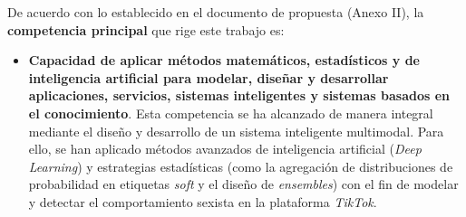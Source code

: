 De acuerdo con lo establecido en el documento de propuesta (Anexo II), la \textbf{competencia principal} que rige este trabajo es: 
\begin{itemize}
    \item \textbf{Capacidad de aplicar métodos matemáticos, estadísticos y de inteligencia artificial para modelar, diseñar y desarrollar aplicaciones, servicios, sistemas inteligentes y sistemas basados en el conocimiento}. Esta competencia se ha alcanzado de manera integral mediante el diseño y desarrollo de un sistema inteligente multimodal. Para ello, se han aplicado métodos avanzados de inteligencia artificial (\textit{Deep Learning}) y estrategias estadísticas (como la agregación de distribuciones de probabilidad en etiquetas \textit{soft} y el diseño de \textit{ensembles}) con el fin de modelar y detectar el comportamiento sexista en la plataforma \textit{TikTok}.
\end{itemize}


